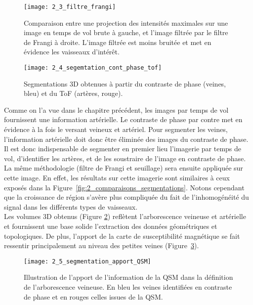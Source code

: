 \begin{figure}[!t]
\centering
\texttt{[image: 2\_3\_filtre\_frangi]}
\caption{Comparaison entre une projection des intensités maximales sur une image en temps de vol brute à gauche, et l'image filtrée par le filtre de Frangi à droite. L'image filtrée est moins bruitée et met en évidence les vaisseaux d'intérêt.}
\label{fig:2_3_filtre_frangi}	
\end{figure}	

\begin{figure}[!b]
\centering
\texttt{[image: 2\_4\_segemtation\_cont\_phase\_tof]}
\caption{Segmentations 3D obtenues à partir du contraste de phase (veines, bleu) et du ToF (artères, rouge).}
\label{fig:2_4_segemtation_cont_phase_tof}	
\end{figure}	

Comme on l’a vue dans le chapitre précédent, les images par temps de vol fournissent une information artérielle. Le contraste de phase par contre met en évidence à la fois le versant veineux et artériel. Pour segmenter les veines, l’information artérielle doit donc être éliminée des images du contraste de phase. Il est donc indispensable de segmenter en premier lieu l’imagerie par temps de vol, d’identifier les artères, et de les soustraire de l’image en contraste de phase. La même méthodologie (filtre de Frangi et seuillage) sera ensuite appliquée sur cette image. En effet, les résultats sur cette imagerie sont similaires à ceux exposés dans la Figure~\ref{fig:2_comparaisons_segmentations}. Notons cependant que la croissance de région s'avère plus compliquée du fait de l'inhomogénéité du signal dans les différents types de vaisseaux.\\

Les volumes 3D obtenus (Figure \ref{fig:2_4_segemtation_cont_phase_tof}) reflètent l’arborescence veineuse et artérielle et fournissent une base solide l’extraction des données géométriques et topologiques. De plus, l’apport de la carte de susceptibilité magnétique se fait ressentir principalement au niveau des petites veines (Figure~\ref{fig:2_5_segmentation_apport_QSM}).
\begin{figure}[!t]
\centering
\texttt{[image: 2\_5\_segmentation\_apport\_QSM]}
\caption{Illustration de l'apport de l'information de la QSM dans la définition de l'arborescence veineuse. En bleu les veines identifiées en contraste de phase et en rouges celles issues de la QSM.}
\label{fig:2_5_segmentation_apport_QSM}	
\end{figure}	
